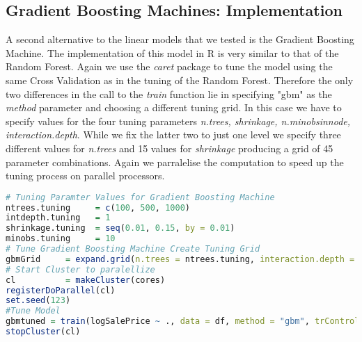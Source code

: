 \subsection{Gradient Boosting Machines: Implementation}
A second alternative to the linear models that we tested is the Gradient Boosting Machine. The implementation of this model in R is very similar to that of the Random Forest. Again we use the \textit{caret} package to tune the model using the same Cross Validation as in the tuning of the Random Forest. Therefore the only two differences in the call to the \textit{train} function lie in specifying "gbm" as the \textit{method} parameter and choosing a different tuning grid. In this case we have to specify values for the four tuning parameters \textit{n.trees, shrinkage, n.minobsinnode, interaction.depth}. While we fix the latter two to just one level we specify three different values for \textit{n.trees} and 15 values for \textit{shrinkage} producing a grid of 45 parameter combinations.
Again we parralelise the computation to speed up the tuning process on parallel processors.

\begin{lstlisting}[language=R]
# Tuning Paramter Values for Gradient Boosting Machine
ntrees.tuning     = c(100, 500, 1000)
intdepth.tuning   = 1
shrinkage.tuning  = seq(0.01, 0.15, by = 0.01)
minobs.tuning     = 10
# Tune Gradient Boosting Machine Create Tuning Grid
gbmGrid     = expand.grid(n.trees = ntrees.tuning, interaction.depth = intdepth.tuning, shrinkage = shrinkage.tuning, n.minobsinnode = minobs.tuning)
# Start Cluster to paralellize
cl          = makeCluster(cores)
registerDoParallel(cl)
set.seed(123)
#Tune Model
gbmtuned = train(logSalePrice ~ ., data = df, method = "gbm", trControl = CrossValidation, verbose = TRUE, tuneGrid = gbmGrid)
stopCluster(cl)
\end{lstlisting}